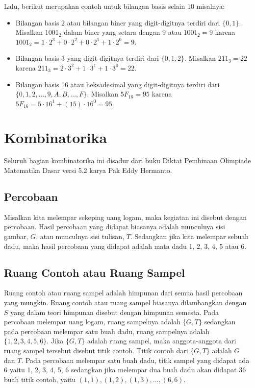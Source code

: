     Lalu, berikut merupakan contoh untuk bilangan basis selain 10 misalnya: 
    \begin{itemize}
        \item Bilangan basis 2 atau bilangan biner yang digit-digitnya terdiri dari $\{0,1\}$. Misalkan $1001_2$ dalam biner yang setara dengan $9$ atau $1001_2 = 9$ karena $1001_2 = 1\cdot 2^3+0\cdot 2^2+0\cdot 2^1+1\cdot 2^0 = 9$. 
        \item Bilangan basis 3 yang digit-digitnya terdiri dari $\{0,1,2\}$. Misalkan $211_3 = 22$ karena $211_3 = 2\cdot 3^2+ 1\cdot 3^1+ 1\cdot 3^0 = 22$.
        \item Bilangan basis 16 atau heksadesimal yang digit-digitnya terdiri dari $\{0,1,2,\dots,9,A,B,\dots,F\}$. Misalkan $5F_{16} = 95$ karena $5F_{16} = 5 \cdot 16^1 + (15)\cdot 16^0 = 95$.
    \end{itemize}
   
    \section{Kombinatorika}
    Seluruh bagian kombinatorika ini disadur dari buku Diktat Pembinaan Olimpiade Matematika Dasar versi 5.2 karya Pak Eddy Hermanto.
    
    \subsection{Percobaan}
Misalkan kita melempar sekeping uang logam, maka kegiatan ini disebut dengan percobaan. Hasil 
percobaan yang didapat biasanya adalah munculnya sisi gambar, $G$, atau munculnya sisi tulisan, $T$. 
Sedangkan jika kita melempar sebuah dadu, maka hasil percobaan yang didapat adalah mata dadu 1, 
2, 3, 4, 5 atau 6. 

\subsection{Ruang Contoh atau Ruang Sampel} 
Ruang contoh atau ruang sampel adalah himpunan dari semua hasil percobaan yang mungkin. Ruang 
contoh atau ruang sampel biasanya dilambangkan dengan $S$ yang dalam teori himpunan disebut 
dengan himpunan semesta. 
Pada percobaan melempar uang logam, ruang sampelnya adalah $\{G, T\}$ sedangkan pada percobaan
melempar satu buah dadu, ruang sampelnya adalah $\{1, 2, 3, 4, 5, 6\}$. 
Jika $\{G, T\}$ adalah ruang sampel, maka anggota-anggota dari ruang sampel tersebut disebut titik
contoh. Titik contoh dari $\{G, T\}$ adalah $G$ dan $T$. Pada percobaan melempar satu buah dadu, titik 
sampel yang didapat ada 6 yaitu 1, 2, 3, 4, 5, 6 sedangkan jika melempar dua buah dadu akan didapat
36 buah titik contoh, yaitu $(1, 1), (1, 2), (1, 3), \dots , (6, 6)$. 

